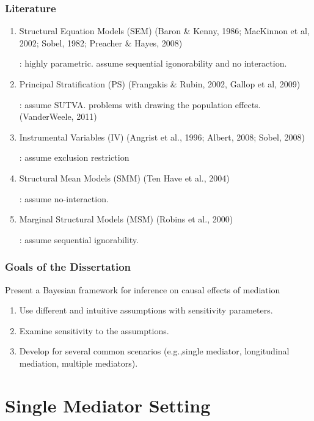 \documentclass{beamer}
\begin{document}
\begin{frame}
\frametitle{Literature}
\begin{enumerate}
\item {\color{red} Structural Equation Models} (SEM) (Baron \& Kenny, 1986; MacKinnon
  et al, 2002; Sobel, 1982; Preacher \& Hayes, 2008)

: highly parametric. assume sequential igonorability and no interaction.
\item {\color{red} Principal Stratification} (PS) (Frangakis \& Rubin,
  2002, Gallop et al, 2009)

: assume SUTVA. problems with drawing the population effects. (VanderWeele, 2011)
\item {\color{red} Instrumental Variables} (IV) (Angrist et al., 1996;
  Albert, 2008; Sobel, 2008)

: assume exclusion restriction
\item {\color{red} Structural Mean Models} (SMM) (Ten Have et al.,
  2004)

: assume no-interaction.
\item {\color{red} Marginal Structural Models} (MSM) (Robins et al., 2000)

: assume sequential ignorability. 
\end{enumerate}
\end{frame}


\begin{frame}
\frametitle{Goals of the Dissertation}
Present a Bayesian framework for inference on causal effects of
mediation
\bigskip
\begin{enumerate}
\item Use different and intuitive assumptions with sensitivity parameters.
\bigskip
\item Examine sensitivity to the assumptions.
\bigskip
\item Develop for several common scenarios (e.g.,single mediator,
  longitudinal mediation, multiple mediators).
\bigskip
\end{enumerate}
\end{frame}


\section{Single Mediator Setting}
\begin{frame}

 

\end{frame}
\end{document}
